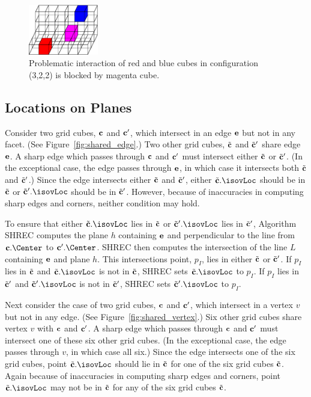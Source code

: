 \begin{figure}[t]
\centering

\includegraphics[width=1.2in]{images/config3D_3_2_2_B.eps}

\caption{Problematic interaction of red and blue cubes
in configuration (3,2,2) is blocked by magenta cube.}
\label{fig:blocked3D}
\end{figure}

\subsection{Locations on Planes}

Consider two grid cubes, $\mathbf{c}$ and $\mathbf{c}'$, 
which intersect in an edge $\mathbf{e}$ but not in any facet.
(See Figure~\ref{fig:shared_edge}.)
Two other grid cubes, ${\tilde{\mathbf{c}}}$ and ${\tilde{\mathbf{c}}}'$ share edge $\mathbf{e}$.
A sharp edge which passes through $\mathbf{c}$ and $\mathbf{c}'$ must intersect
either ${\tilde{\mathbf{c}}}$ or ${\tilde{\mathbf{c}}}'$.
(In the exceptional case, the edge passes through $\mathbf{e}$,
in which case it intersects both ${\tilde{\mathbf{c}}}$ and ${\tilde{\mathbf{c}}}'$.)
Since the edge intersects either ${\tilde{\mathbf{c}}}$ and ${\tilde{\mathbf{c}}}'$,
either $\tcb.\isovLoc$ should be in ${\tilde{\mathbf{c}}}$ 
or $\tcb'.\isovLoc$ should be in ${\tilde{\mathbf{c}}}'$.
However, because of inaccuracies in computing sharp edges and corners,
neither condition may hold.

To ensure that either $\tcb.\isovLoc$ lies in ${\tilde{\mathbf{c}}}$
or $\tcb'.\isovLoc$ lies in ${\tilde{\mathbf{c}}}'$,
Algorithm SHREC computes the plane $h$ containing $\mathbf{e}$
and perpendicular to the line from $\cb.\Center$ to $\cb'.\Center$.
SHREC then computes the intersection of the line $L$ containing $\mathbf{e}$
and plane $h$.
This intersections point, $p_I$, lies in either ${\tilde{\mathbf{c}}}$ or ${\tilde{\mathbf{c}}}'$.
If $p_I$ lies in ${\tilde{\mathbf{c}}}$ and $\tcb.\isovLoc$ is not in ${\tilde{\mathbf{c}}}$,
SHREC sets $\tcb.\isovLoc$ to $p_I$.
If $p_I$ lies in ${\tilde{\mathbf{c}}}'$ and $\tcb'.\isovLoc$ is not in ${\tilde{\mathbf{c}}}'$,
SHREC sets $\tcb'.\isovLoc$ to $p_I$.

Next consider the case of two grid cubes, $\mathbf{c}$ and $\mathbf{c}'$, 
which intersect in a vertex $v$ but not in any edge.
(See Figure~\ref{fig:shared_vertex}.)
Six other grid cubes share vertex $v$ with $\mathbf{c}$ and $\mathbf{c}'$.
A sharp edge which passes through $\mathbf{c}$ and $\mathbf{c}'$ must intersect
one of these six other grid cubes.
(In the exceptional case, the edge passes through $v$,
in which case all six.)
Since the edge intersects one of the six grid cubes,
point $\tcb.\isovLoc$ should lie in ${\tilde{\mathbf{c}}}$ for one of the six grid cubes ${\tilde{\mathbf{c}}}$.
Again because of inaccuracies in computing sharp edges and corners,
point $\tcb.\isovLoc$ may not be in ${\tilde{\mathbf{c}}}$ for any of the six grid cubes ${\tilde{\mathbf{c}}}$.

